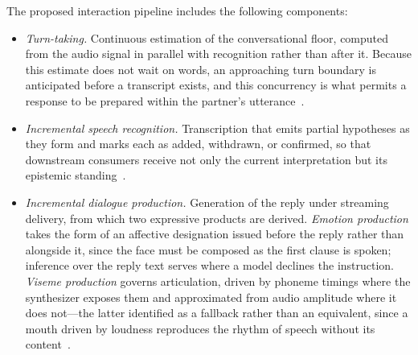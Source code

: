 %
The proposed interaction pipeline includes the following components:
\begin{itemize}
  \item \textit{Turn-taking.} Continuous estimation of the conversational
        floor, computed from the audio signal in parallel with recognition
        rather than after it. Because this estimate does not wait on words, an
        approaching turn boundary is anticipated before a transcript exists,
        and this concurrency is what permits a response to be prepared within
        the partner's utterance~\cite{skantze2021review, ekstedt2022vap}.
  \item \textit{Incremental speech recognition.} Transcription that emits
        partial hypotheses as they form and marks each as added, withdrawn, or
        confirmed, so that downstream consumers receive not only the current
        interpretation but its epistemic standing~\cite{schlangen2011iu,
        michael2020retico}.
  \item \textit{Incremental dialogue production.} Generation of the reply
        under streaming delivery, from which two expressive products are
        derived. \textit{Emotion production} takes the form of an affective
        designation issued before the reply rather than alongside it, since
        the face must be composed as the first clause is spoken; inference
        over the reply text serves where a model declines the instruction.
        \textit{Viseme production} governs articulation, driven by phoneme
        timings where the synthesizer exposes them and approximated from
        audio amplitude where it does not---the latter identified as a
        fallback rather than an equivalent, since a mouth driven by loudness
        reproduces the rhythm of speech without its
        content~\cite{zhou2018visemenet, edwards2016jali}.

\end{itemize}
